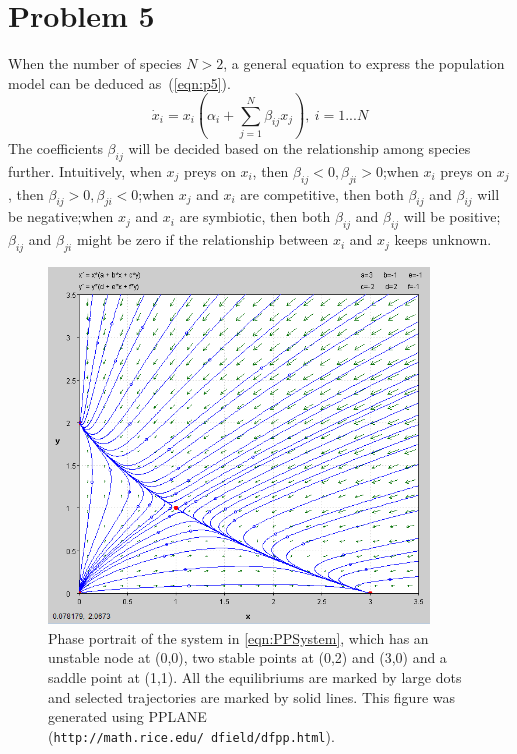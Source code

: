 \documentclass[a4paper,twocolumn]{article} %
\begin{document}
\section{Problem 5}
\label{sec:prob5} 
When the number of species $N>2$, a general equation to express the population model can be deduced as~(\ref{eqn:p5}).
\begin{equation}\label{eqn:p5}
   \dot{x}_i = x_i(\alpha_i+ \sum_{j=1}^{N} \beta_{ij}x_j), ~i=1...N
\end{equation}
The coefficients $\beta_{ij}$ will be decided based on the relationship among species further. Intuitively, when $x_j$ preys on $x_i$, then $\beta_{ij}<0, \beta_{ji}>0$;when $x_i$ preys on $x_j$, then $\beta_{ij}>0, \beta_{ji}<0$;when $x_j$ and $x_i$ are competitive, then both $\beta_{ij}$ and $\beta_{ij}$ will be negative;when $x_j$ and $x_i$ are symbiotic, then both $\beta_{ij}$ and $\beta_{ij}$ will be positive;$\beta_{ij}$ and $\beta_{ji}$ might be zero if the relationship between $x_i$ and $x_j$ keeps unknown. 

\begin{figure}[p] %
  \begin{center}
    \includegraphics[width = 0.9\textwidth, height = 0.5\textwidth]{-2-1}
  \end{center}
  \caption{Phase portrait of the system in \eqref{eqn:PPSystem}, which has an unstable node at \mbox{(0,0)}, two stable points at \mbox{(0,2)} and \mbox{(3,0)} and a saddle point at \mbox{(1,1)}. All the equilibriums are marked by large dots and selected trajectories are marked by solid lines. This figure was generated using PPLANE (\texttt{http://math.rice.edu/~dfield/dfpp.html}).}
  \label{fig:pplane}
\end{figure}
\end{document}
